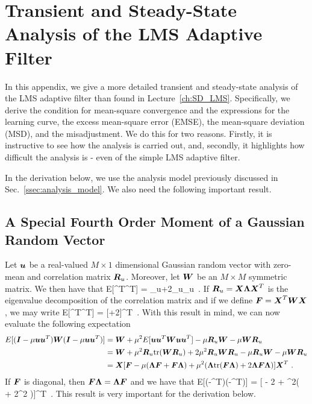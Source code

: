 \chapter{Transient and Steady-State Analysis of the LMS Adaptive Filter}
\label{app:lms_analysis}
In this appendix, we give a more detailed transient and steady-state analysis of the LMS adaptive filter than found in Lecture~\ref{ch:SD_LMS}. Specifically, we derive the condition for mean-square convergence and the expressions for the learning curve, the excess mean-square error (EMSE), the mean-square deviation (MSD), and the misadjustment. We do this for two reasons. Firstly, it is instructive to see how the analysis is carried out, and, secondly, it highlights how difficult the analysis is - even of the simple LMS adaptive filter. 

In the derivation below, we use the analysis model previously discussed in Sec.~\ref{ssec:analysis_model}. We also need the following important result.

\section{A Special Fourth Order Moment of a Gaussian Random Vector}
Let $\boldsymbol{u}$ be a real-valued $M\times 1$ dimensional Gaussian random vector with zero-mean and correlation matrix $\boldsymbol{R}_u$. Moreover, let $\boldsymbol{W}$ be an $M\times M$ symmetric matrix. We then have that \cite[p.~44]{Sayed2003}
\bmath
  E[^T^T] = _u+2_u_u\ .
\emath
If $\boldsymbol{R}_u = \boldsymbol{X\Lambda X}^T$ is the eigenvalue decomposition of the correlation matrix and if we define $\boldsymbol{F}=\boldsymbol{X}^T\boldsymbol{WX}$, we may write
\bmath
  E[^T^T] = [\vect{\Lambda}+2]^T\ .
\emath
With this result in mind, we can now evaluate the following expectation
\begin{align}
  E[(\boldsymbol{I}-\mu\boldsymbol{u}\boldsymbol{u}^T)\boldsymbol{W}(\boldsymbol{I}-\mu\boldsymbol{u}\boldsymbol{u}^T)]&= \boldsymbol{W}+\mu^2E[\boldsymbol{uu}^T\boldsymbol{Wuu}^T]-\mu\boldsymbol{R}_u\boldsymbol{W}-\mu\boldsymbol{W}\boldsymbol{R}_u\\
  &= \boldsymbol{W} + \mu^2\boldsymbol{R}_u\textup{tr}(\boldsymbol{WR}_u)+2\mu^2\boldsymbol{R}_u\boldsymbol{WR}_u -\mu\boldsymbol{R}_u\boldsymbol{W}-\mu\boldsymbol{W}\boldsymbol{R}_u\\
  &= \boldsymbol{X}[\boldsymbol{F} - \mu(\boldsymbol{\Lambda F}+\boldsymbol{F\Lambda}) + \mu^2(\boldsymbol{\Lambda}\textup{tr}(\boldsymbol{F\Lambda}) + 2\boldsymbol{\Lambda F\Lambda})]\boldsymbol{X}^T\ .
\end{align}
If $\boldsymbol{F}$ is diagonal, then $\boldsymbol{F\Lambda}=\boldsymbol{\Lambda F}$ and we have that
\bmath
	E[(-\mu{}^T)(-\mu{}^T)] = [ - 2\mu{} + \mu^2(\vect{\Lambda} + 2\vect{\Lambda}^2 )]^T\ .
	  \label{eq:app_lms_4mom}
\emath
This result is very important for the derivation below.

